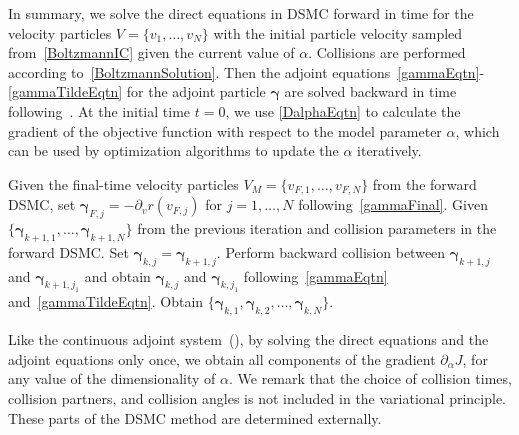 \documentclass[times,final,nopreprintline]{elsarticle}
\newcommand{\bgamma}{\boldsymbol \gamma}
\begin{document}
In summary, we solve the direct equations in DSMC forward in time for the velocity particles $V=\{v_1, \ldots , v_N \}$ with the initial particle velocity sampled from~\eqref{BoltzmannIC} given the current value of $\alpha$. Collisions are performed according to~\eqref{BoltzmannSolution}. 
Then the adjoint equations~\eqref{gammaEqtn}-\eqref{gammaTildeEqtn} for the adjoint particle $\bgamma$ are solved backward in time following~.
At the initial time $t=0$, we use \eqref{DalphaEqtn} to calculate the gradient of the objective function with respect to the model parameter $\alpha$, which can be used by optimization algorithms to update the $\alpha$ iteratively. 


\begin{algorithm}[ht!]
\caption{Algorithm for solving the discrete adjoint DSMC system~\eqref{gammaEqtns}.~\label{alg:adj_DSMC1}}
\begin{algorithmic}[1]
\State Given the final-time velocity particles $V_{M} = \{v_{F,1},\ldots, v_{F,N}\}$ from the forward DSMC, set $\bgamma_{F,j} = - \partial_v r(v_{F,j})$ for $j=1,\ldots,N$ following~\eqref{gammaFinal}.
\State Given $\{\bgamma_{k+1,1},\ldots, \bgamma_{k+1,N}\}$ from the previous iteration and collision parameters in the forward DSMC.
\State Set $\bgamma_{k,j} = \bgamma_{k+1,j}$.
\State Perform backward collision between $\bgamma_{k+1,j}$ and $\bgamma_{k+1,j_1}$ and obtain $\bgamma_{k,j}$ and $\bgamma_{k,j_1}$ following~\eqref{gammaEqtn} and~\eqref{gammaTildeEqtn}. 
\EndIf
\State Obtain $\{\bgamma_{k,1},\bgamma_{k,2}, \ldots, \bgamma_{k,N}\}$.
\EndFor
\end{algorithmic}
\end{algorithm}

Like the continuous adjoint system~(), by solving the direct equations and the adjoint equations only once, we obtain all components of the gradient $\partial_\alpha J$, for any value of the dimensionality of $\alpha$. We remark that the choice of collision times, collision partners, and collision angles is not included in the variational principle. These parts of the DSMC method are determined externally.
\end{document}
